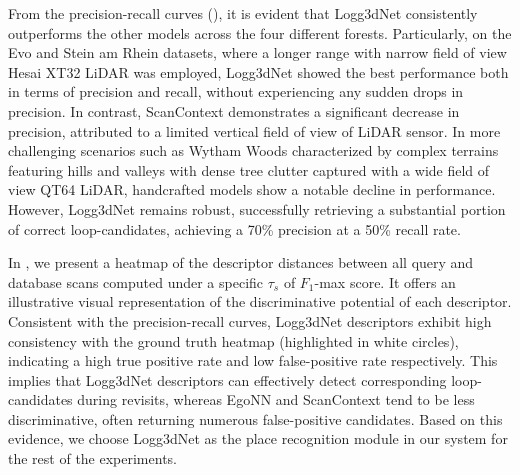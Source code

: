 From the precision-recall curves (), it is evident that Logg3dNet consistently outperforms the other models across the four different forests. Particularly, on the Evo and Stein am Rhein datasets, where a longer range with narrow field of view Hesai XT32 LiDAR was employed, Logg3dNet showed the best performance both in terms of precision and recall, without experiencing any sudden drops in precision.
In contrast, ScanContext demonstrates a significant decrease in precision, attributed to a limited vertical field of view of LiDAR sensor. In more challenging scenarios such as Wytham Woods characterized by complex terrains featuring hills and valleys with dense tree clutter captured with a wide field of view QT64 LiDAR, handcrafted models show a notable decline in performance. However, Logg3dNet remains robust, successfully retrieving a substantial portion of correct loop-candidates, achieving a 70\% precision at a 50\% recall rate. 


In , we present a heatmap of the descriptor distances between all query and database scans computed under a specific $\tau_{s}$ of  $F_1$-max score. It offers an illustrative visual representation of the discriminative potential of each descriptor. Consistent with the precision-recall curves, Logg3dNet descriptors exhibit high consistency with the ground truth heatmap (highlighted in white circles), indicating a high true positive rate and low false-positive rate respectively. This implies that Logg3dNet descriptors can effectively detect corresponding loop-candidates during revisits, whereas EgoNN and ScanContext tend to be less discriminative, often returning numerous false-positive candidates.  Based on this evidence, we choose Logg3dNet as the place recognition module in our system for the rest of the experiments.

